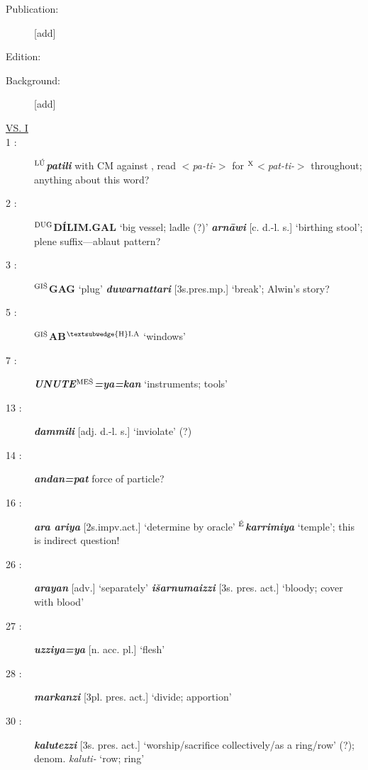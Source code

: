 \documentclass[10pt]{article}
\newcommand{\supersc}[1]{$^{\textrm{\scriptsize{#1}}}$}  	%
\newcommand{\bit}[1]{\textbf{\textit{#1}}}				%
\newcommand{\p}[1]{{\tiny[{#1}]}}					%
\newcommand{\hith}{\textsubwedge{h}}
\newcommand{\Hith}{\textsubwedge{H}}
\newcommand{\hpl}{\supersc{{\Hith}I.A}}
\newcommand{\man}{\supersc{L\'U}}
\newcommand{\mpl}{\supersc{ME\v{S}}}
\newcommand{\wood}{\supersc{GI\v{S}}}
\renewcommand{\.}[1]{\textsubdot{#1}}
\begin{document}
\begin{description}

\item[Publication:] [add]
\item[Edition:] \citet{strauss2006ritual}
\item[Background:] [add]

\bigskip

\item[\underline{VS. I}]

\item[1 :] \textbf{\man}\bit{patili} with CM against \citeauthor{strauss2006ritual}, read $<$\textit{pa-ti-}$>$ for \supersc{X}$<$\textit{pat-ti-}$>$ throughout; anything about this word?

\item[2 :] \textbf{\supersc{DUG}D\'ILIM.GAL} `big vessel; ladle (?)' \bit{{\hith}arn\=awi} \p{c. d.-l. s.} `birthing stool'; plene suffix---ablaut pattern?

\item[3 :] \textbf{{\wood}GAG} `plug' \bit{duwarnattari} \p{3s.pres.mp.} `break'; Alwin's story?

\bigskip

\item[5 :] \textbf{{\wood}AB{\hpl}} `windows'

\item[7 :] {\bit{UNUTE}\textbf{\mpl}\bit{=ya=kan}} `instruments; tools'

\item[13 :] \bit{dammili} \p{adj. d.-l. s.} `inviolate' (?)

\item[14 :] \bit{andan=pat} force of particle?

\item[16 :] \bit{ar{\hith}a ariya} \p{2s.impv.act.} `determine by oracle' \textbf{\supersc{\'E}}\bit{karrimiya} `temple'; this is indirect question!

\item[26 :] \bit{ar{\hith}ayan} \p{adv.} `separately' \bit{i\v{s}{\hith}arnumaizzi} \p{3s. pres. act.} `bloody; cover with blood'

\item[27 :] \bit{uzziya=ya} \p{n. acc. pl.} `flesh'

\item[28 :] \bit{markanzi} \p{3pl. pres. act.} `divide; apportion'

\item[30 :] \bit{kalutezzi} \p{3s. pres. act.} `worship/sacrifice collectively/as a ring/row' (?); denom. \textit{kaluti-} `row; ring'


\end{description}
\end{document}
